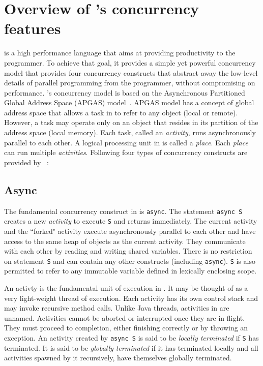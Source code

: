 \section{Overview of \xten's concurrency features}

\xten is a high performance language that aims at providing productivity to the
programmer. To achieve that goal, it provides a simple yet powerful concurrency
model that provides four concurrency constructs that abstract away the low-level
details of parallel programming from the programmer, without compromising on
performance. \xten's concurrency model is based on the Asynchronous Partitioned
Global Address Space (APGAS) model~\cite{apgaspaper}. APGAS model has a concept
of global address space that allows a task in \xten to refer to any object
(local or remote). However, a task may operate only on an object that resides in
its partition of the address space (local memory). Each task, called an
\emph{activity}, runs asynchronously parallel to each other. A logical
processing unit in \xten is called a \emph{place}. Each \emph{place} can run
multiple \emph{activities}.    
Following four types of concurrency constructs are provided by
\xten~\cite{x10intro}:

\subsection{Async} The fundamental concurrency construct in \xten is
\texttt{async}. The statement \texttt{async S} creates a new \emph{activity} to
execute \texttt{S} and returns immediately. The current activity and the
``forked" activity execute asynchronously parallel to each other and have access
to the same heap of objects as the current activity. They communicate with each
other by reading and writing shared variables. There is no restriction on
statement \texttt{S} and can contain any other constructs (including
\texttt{async}). \texttt{S} is also permitted to refer to any immutable variable
defined in lexically enclosing scope.

An activty is
the fundamental unit of execution in \xten. It may be thought of as a very
light-weight thread of execution. Each activity has its own control stack and
may invoke recursive method calls. Unlike Java threads, activities in \xten are
unnamed. Activities cannot be aborted or interrupted once they are in flight.
They must proceed to completion, either finishing correctly or by throwing an
exception. An activity created by \texttt{async S} is said to be \emph{locally
terminated} if \texttt{S} has terminated. It is said to be \emph{globally
terminated} if it has terminated locally and all activities spawned by it
recursively, have themselves globally terminated.
   
